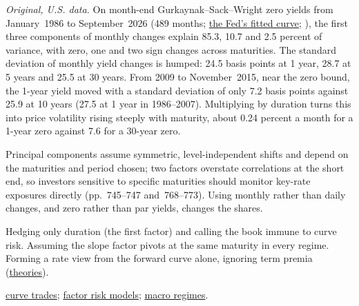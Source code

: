 \begin{qfmethod}
\emph{Original, U.S. data.} On month-end Gurkaynak--Sack--Wright zero yields from January~1986 to September~2026 (489 months; \hyperref[data:gsw-treasury-curve]{the Fed's fitted curve}; \citep[\texttt{feds200628.csv}, SVENY01--SVENY30 at 1, 2, 3, 5, 7, 10, 20 and 30 years]{fed-gsw-data}), the first three components of monthly changes explain 85.3, 10.7 and 2.5 percent of variance, with zero, one and two sign changes across maturities. The standard deviation of monthly yield changes is humped: 24.5 basis points at 1 year, 28.7 at 5 years and 25.5 at 30 years. From 2009 to November~2015, near the zero bound, the 1-year yield moved with a standard deviation of only 7.2 basis points against 25.9 at 10 years (27.5 at 1 year in 1986--2007). Multiplying by duration turns this into price volatility rising steeply with maturity, about 0.24 percent a month for a 1-year zero against 7.6 for a 30-year zero.

 Principal components assume symmetric, level-independent shifts and depend on the maturities and period chosen; two factors overstate correlations at the short end, so investors sensitive to specific maturities should monitor key-rate exposures directly (pp.~745--747 and~768--773). Using monthly rather than daily changes, and zero rather than par yields, changes the shares.

 Hedging only duration (the first factor) and calling the book immune to curve risk. Assuming the slope factor pivots at the same maturity in every regime. Forming a rate view from the forward curve alone, ignoring term premia (\hyperref[res:term-structure-theories]{theories}).

 \hyperref[meth:curve-trades-carry-rolldown]{curve trades}; \hyperref[mod:factor-risk-model]{factor risk models}; \hyperref[def:macro-regime-asset-map]{macro regimes}.

\end{qfmethod}
